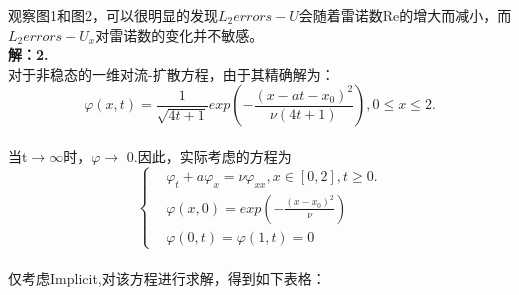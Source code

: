 \documentclass[a4paper,11pt,UTF8]{article}%
\theoremstyle{plain}
\begin{document}
\indent 观察图1和图2，可以很明显的发现$L_2errors-U$会随着雷诺数Re的增大而减小，而$L_2errors-U_x$对雷诺数的变化并不敏感。\\

\noindent \textbf{解：2.}\\
\indent 对于非稳态的一维对流-扩散方程，由于其精确解为：	
$$\varphi\left(x,t\right)=\frac{1}{\sqrt{4t+1}}exp\left(-\frac{\left(x-at-x_0\right)^2}{\nu \left(4t+1\right)}\right),0\leq x\leq 2.$$\\
当t$\rightarrow$$\infty$时，$\varphi$$\rightarrow$ 0.因此，实际考虑的方程为\\
	$$\left\{
\begin{aligned}
	&\varphi_t+a\varphi_x=\nu\varphi_{xx},x\in \left[0,2\right],t\geq 0.\\
	&\varphi\left(x,0\right)=exp\left(-\frac{\left(x-x_0\right)^2}{\nu}\right)\\
	&\varphi\left(0,t\right)=\varphi\left(1,t\right)=0
\end{aligned}
\right.$$\\
\indent 仅考虑Implicit,对该方程进行求解，得到如下表格：\\
\end{document}
